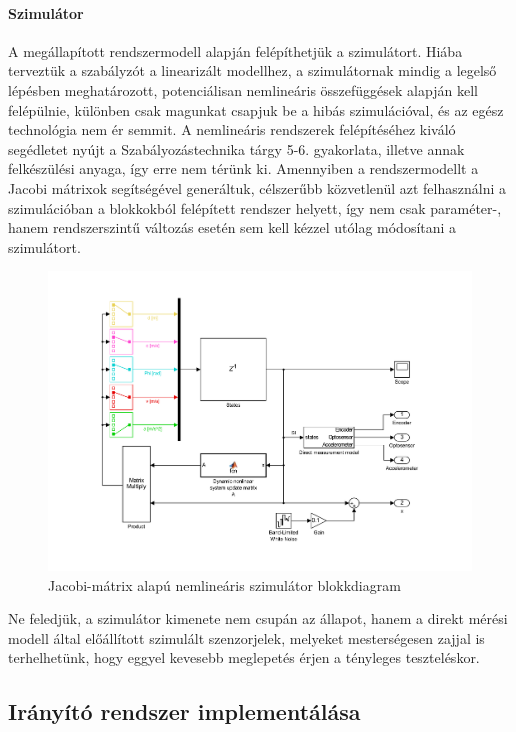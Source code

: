\paragraph{Szimulátor}

A megállapított rendszermodell alapján felépíthetjük a szimulátort. Hiába terveztük a szabályzót a linearizált modellhez, a szimulátornak mindig a legelső lépésben meghatározott, potenciálisan nemlineáris összefüggések alapján kell felépülnie, különben csak magunkat csapjuk be a hibás szimulációval, és az egész technológia nem ér semmit.
A nemlineáris rendszerek felépítéséhez kiváló segédletet nyújt a Szabályozástechnika tárgy 5-6. gyakorlata, illetve annak felkészülési anyaga\cite[p.~319-354]{szabtech}, így erre nem térünk ki. Amennyiben a rendszermodellt a Jacobi mátrixok segítségével generáltuk, célszerűbb közvetlenül azt felhasználni a szimulációban a blokkokból felépített rendszer helyett, így nem csak paraméter-, hanem rendszerszintű változás esetén sem kell kézzel utólag módosítani a szimulátort.

\begin{figure}[!ht]
    \centering
    \includegraphics[width=\linewidth]{img/sys}
    \centering
    \caption{Jacobi-mátrix alapú nemlineáris szimulátor blokkdiagram}
    \label{fig:model}
\end{figure}

Ne feledjük, a szimulátor kimenete nem csupán az állapot, hanem a direkt mérési modell által előállított szimulált szenzorjelek, melyeket mesterségesen zajjal is terhelhetünk, hogy eggyel kevesebb meglepetés érjen a tényleges teszteléskor.

\subsection{Irányító rendszer implementálása}

